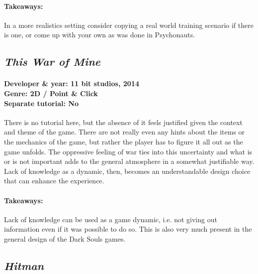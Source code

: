\paragraph{Takeaways:}
In a more realistics setting consider copying a real world training scenario if there is one, or come up with your own as was done in Psychonauts.

\subsection{\textit{This War of Mine}}
\paragraph{Developer \& year: 11 bit studios, 2014 \\ Genre: 2D / Point \& Click \\ Separate tutorial: No \\}
There is no tutorial here, but the absence of it feels justified given the context and theme of the game. There are not really even any hints about the items or the mechanics of the game, but rather the player has to figure it all out as the game unfolds. The oppressive feeling of war ties into this uncertainty and what is or is not important adds to the general atmosphere in a somewhat justifiable way. Lack of knowledge as a dynamic, then, becomes an understandable design choice that can enhance the experience.
\paragraph{Takeaways:}
Lack of knowledge can be used as a game dynamic, i.e. not giving out information even if it was possible to do so. This is also very much present in the general design of the Dark Souls games.

\subsection{\textit{Hitman}}
